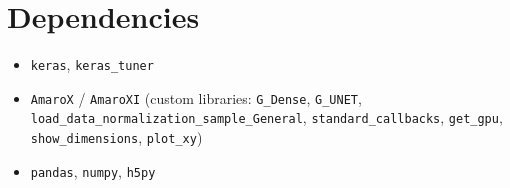 \documentclass[11pt,a4paper]{article}
\begin{document}
\section{Dependencies}

\begin{itemize}
    \item \texttt{keras}, \texttt{keras\_tuner}
    \item \texttt{AmaroX} / \texttt{AmaroXI} (custom libraries: \texttt{G\_Dense}, \texttt{G\_UNET}, \texttt{load\_data\_normalization\_sample\_General}, \texttt{standard\_callbacks}, \texttt{get\_gpu}, \texttt{show\_dimensions}, \texttt{plot\_xy})
    \item \texttt{pandas}, \texttt{numpy}, \texttt{h5py}
\end{itemize}
\end{document}
